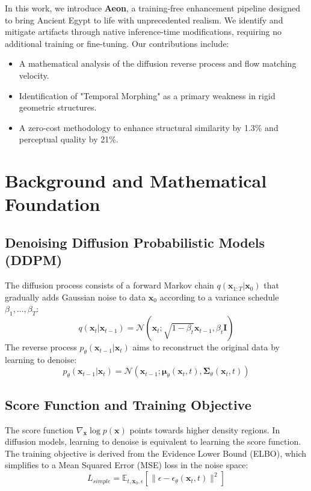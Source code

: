 \documentclass[10pt, conference]{IEEEtran}
\begin{document}
In this work, we introduce \textbf{Aeon}, a training-free enhancement pipeline designed to bring Ancient Egypt to life with unprecedented realism. We identify and mitigate artifacts through native inference-time modifications, requiring no additional training or fine-tuning. Our contributions include:
\begin{itemize}
    \item A mathematical analysis of the diffusion reverse process and flow matching velocity.
    \item Identification of "Temporal Morphing" as a primary weakness in rigid geometric structures.
    \item A zero-cost methodology to enhance structural similarity by 1.3\% and perceptual quality by 21\%.
\end{itemize}

\section{Background and Mathematical Foundation}
\subsection{Denoising Diffusion Probabilistic Models (DDPM)}
The diffusion process consists of a forward Markov chain $q(\mathbf{x}_{1:T} | \mathbf{x}_0)$ that gradually adds Gaussian noise to data $\mathbf{x}_0$ according to a variance schedule $\beta_1, \dots, \beta_T$:
\begin{equation}
q(\mathbf{x}_t | \mathbf{x}_{t-1}) = \mathcal{N}(\mathbf{x}_t; \sqrt{1-\beta_t}\mathbf{x}_{t-1}, \beta_t \mathbf{I})
\end{equation}
The reverse process $p_\theta(\mathbf{x}_{t-1} | \mathbf{x}_t)$ aims to reconstruct the original data by learning to denoise:
\begin{equation}
p_\theta(\mathbf{x}_{t-1} | \mathbf{x}_t) = \mathcal{N}(\mathbf{x}_{t-1}; \mathbf{\mu}_\theta(\mathbf{x}_t, t), \mathbf{\Sigma}_\theta(\mathbf{x}_t, t))
\end{equation}

\subsection{Score Function and Training Objective}
The score function $\nabla_{\mathbf{x}} \log p(\mathbf{x})$ points towards higher density regions. In diffusion models, learning to denoise is equivalent to learning the score function. The training objective is derived from the Evidence Lower Bound (ELBO), which simplifies to a Mean Squared Error (MSE) loss in the noise space:
\begin{equation}
L_{simple} = \mathbb{E}_{t, \mathbf{x}_0, \epsilon} [ \| \epsilon - \epsilon_\theta(\mathbf{x}_t, t) \|^2 ]
\end{equation}
\end{document}
